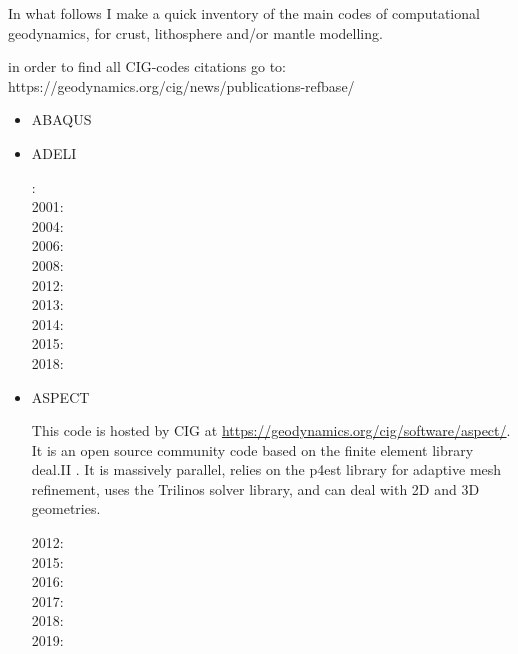 
In what follows I make a quick inventory of the main codes of computational geodynamics, 
for crust, lithosphere and/or mantle modelling.

in order to find all CIG-codes citations go to: https://geodynamics.org/cig/news/publications-refbase/

\begin{itemize}

\item {\codefont ABAQUS} 

{\small
\noindent
\cite{brry01}
\cite{gedh02}
\cite{fumr03}
\cite{camg07}
\cite{kuhe09}
\cite{makh09}
\cite{camg10}
\cite{nalr12}
\cite{pevp15}
\cite{naam17}
\cite{naam18}
}

\item {\codefont ADELI} 

{\small
{}: \cite{hajc97}\\
2001: \cite{chzh01}\\
2004: \cite{gocl04}\\
2006: \cite{vech06}\\
2008: \cite{boht08a}\cite{boht08b}\\
2012: \cite{gech12}\cite{gigh12}\\
2013: \cite{wahd13}\\
2014: \cite{cehg14}\\
2015: \cite{ceag15}\\
2018: \cite{cegm18}\cite{gehn18}
}

\item {\codefont ASPECT} 

This code is hosted by CIG at \url{https://geodynamics.org/cig/software/aspect/}. 
It is an open source community code based on the finite element library deal.II \cite{arbc19}. 
It is massively parallel, relies on the p4est library for adaptive mesh refinement,
uses the Trilinos solver library, and can deal with 2D and 3D geometries. 

\noindent
{\small
2012: \cite{krhb12}\\
2015: \cite{aupm15}\cite{tosn15}\\
2016: \cite{dahe16}\cite{gadb16}\cite{zhon16}\\
2017: \cite{hepb17}\cite{daef17}\cite{hedg17}\cite{robh17}\cite{robu17}\cite{aumh17}
      \cite{thie17}\cite{brsg17}\cite{onmz17}\cite{tasm17}\cite{zhli17}\\
2018: \cite{daga18}\cite{onzh18}\cite{gltf18}\cite{heps18}\cite{galh18}\cite{peka18}
      \cite{puth18}\cite{brst18b}\\
2019: \cite{baba19}\cite{stbl19}\cite{cocf19}\cite{liki19}\cite{galb19}\cite{dagg19}
      \cite{njas19}\cite{sepg19}
}


\end{itemize}

